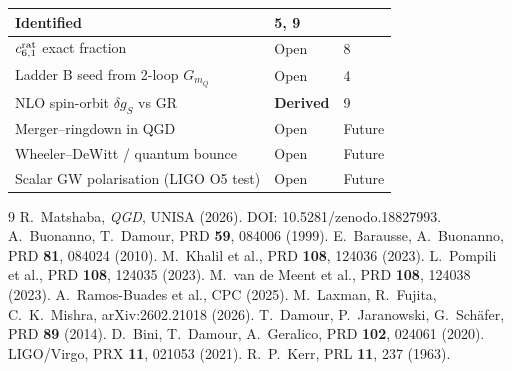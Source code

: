 \documentclass[11pt,a4paper]{article}
\theoremstyle{plain}
\theoremstyle{definition}
\theoremstyle{remark}
\newcommand{\mQ}{m_Q}
\begin{document}
\begin{table}[h]
\begin{tabular}{@{}p{6.8cm}p{3cm}p{2.8cm}@{}}
  \textcolor{confirmed}{\textbf{Identified}} & 5, 9 \\
\midrule
$c_{6,1}^{\rm rat}$ exact fraction &
  \textcolor{open}{Open} & 8 \\
\rowcolor{lightgray}
Ladder B seed from 2-loop $G_{\mQ}$ &
  \textcolor{open}{Open} & 4 \\
NLO spin-orbit $\delta g_S$ vs GR &
  \textcolor{confirmed}{\textbf{Derived}} & 9 \\
\rowcolor{lightgray}
Merger--ringdown in QGD &
  \textcolor{open}{Open} & Future \\
Wheeler--DeWitt / quantum bounce &
  \textcolor{open}{Open} & Future \\
\rowcolor{lightgray}
Scalar GW polarisation (LIGO O5 test) &
  \textcolor{open}{Open} & Future \\
\bottomrule
\end{tabular}
\end{table}

\begin{thebibliography}{9}
R.~Matshaba, \textit{QGD}, UNISA (2026). DOI: 10.5281/zenodo.18827993.
A.~Buonanno, T.~Damour, PRD \textbf{59}, 084006 (1999).
E.~Barausse, A.~Buonanno, PRD \textbf{81}, 084024 (2010).
M.~Khalil et al., PRD \textbf{108}, 124036 (2023).
L.~Pompili et al., PRD \textbf{108}, 124035 (2023).
M.~van de Meent et al., PRD \textbf{108}, 124038 (2023).
A.~Ramos-Buades et al., CPC (2025).
M.~Laxman, R.~Fujita, C.~K.~Mishra, arXiv:2602.21018 (2026).
T.~Damour, P.~Jaranowski, G.~Sch\"afer, PRD \textbf{89} (2014).
D.~Bini, T.~Damour, A.~Geralico, PRD \textbf{102}, 024061 (2020).
LIGO/Virgo, PRX \textbf{11}, 021053 (2021).
R.~P.~Kerr, PRL \textbf{11}, 237 (1963).
\end{thebibliography}
\end{document}
